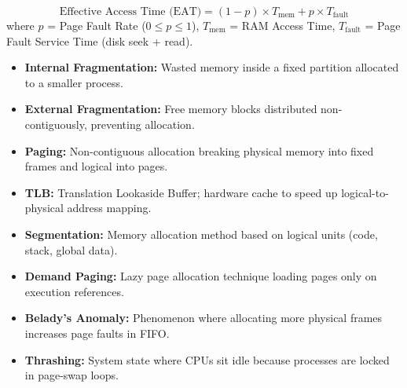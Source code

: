 \documentclass[12pt,a4paper]{article}
\begin{document}
\begin{tcolorbox}[formulabox, title={\textbf{Virtual Memory Math}}]
$$\text{Effective Access Time (EAT)} = (1 - p) \times T_{\text{mem}} + p \times T_{\text{fault}}$$
where $p$ = Page Fault Rate ($0 \le p \le 1$), $T_{\text{mem}}$ = RAM Access Time, $T_{\text{fault}}$ = Page Fault Service Time (disk seek + read).
\end{tcolorbox}

\begin{tcolorbox}[defbox, title={\textbf{One-Line Definitions}}]
\begin{itemize}[leftmargin=*, itemsep=2.5pt, topsep=0pt]
  \item \textbf{Internal Fragmentation:} Wasted memory inside a fixed partition allocated to a smaller process.
  \item \textbf{External Fragmentation:} Free memory blocks distributed non-contiguously, preventing allocation.
  \item \textbf{Paging:} Non-contiguous allocation breaking physical memory into fixed frames and logical into pages.
  \item \textbf{TLB:} Translation Lookaside Buffer; hardware cache to speed up logical-to-physical address mapping.
  \item \textbf{Segmentation:} Memory allocation method based on logical units (code, stack, global data).
  \item \textbf{Demand Paging:} Lazy page allocation technique loading pages only on execution references.
  \item \textbf{Belady's Anomaly:} Phenomenon where allocating more physical frames increases page faults in FIFO.
  \item \textbf{Thrashing:} System state where CPUs sit idle because processes are locked in page-swap loops.
\end{itemize}
\end{tcolorbox}
\end{document}
